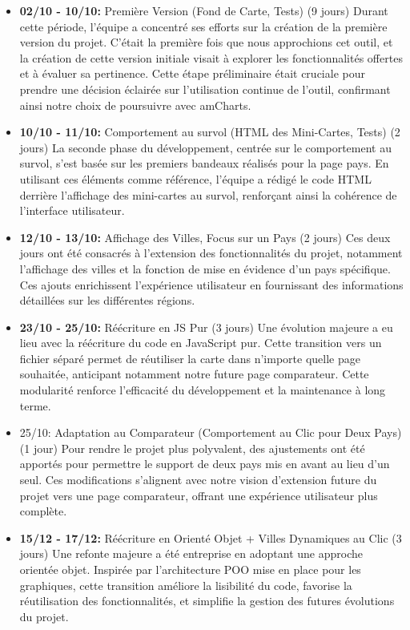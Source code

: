 \documentclass[mstat,12pt]{unswthesis}
\begin{document}
\begin{adjustwidth}{-2cm}{}
\begin{itemize}
\tightlist
\item
  \textbf{02/10 - 10/10:} Première Version (Fond de Carte, Tests) (9
  jours) Durant cette période, l'équipe a concentré ses efforts sur la
  création de la première version du projet. C'était la première fois
  que nous approchions cet outil, et la création de cette version
  initiale visait à explorer les fonctionnalités offertes et à évaluer
  sa pertinence. Cette étape préliminaire était cruciale pour prendre
  une décision éclairée sur l'utilisation continue de l'outil,
  confirmant ainsi notre choix de poursuivre avec amCharts.
\item
  \textbf{10/10 - 11/10:} Comportement au survol (HTML des Mini-Cartes,
  Tests) (2 jours) La seconde phase du développement, centrée sur le
  comportement au survol, s'est basée sur les premiers bandeaux réalisés
  pour la page pays. En utilisant ces éléments comme référence, l'équipe
  a rédigé le code HTML derrière l'affichage des mini-cartes au survol,
  renforçant ainsi la cohérence de l'interface utilisateur.
\item
  \textbf{12/10 - 13/10:} Affichage des Villes, Focus sur un Pays (2
  jours) Ces deux jours ont été consacrés à l'extension des
  fonctionnalités du projet, notamment l'affichage des villes et la
  fonction de mise en évidence d'un pays spécifique. Ces ajouts
  enrichissent l'expérience utilisateur en fournissant des informations
  détaillées sur les différentes régions.
\item
  \textbf{23/10 - 25/10:} Réécriture en JS Pur (3 jours) Une évolution
  majeure a eu lieu avec la réécriture du code en JavaScript pur. Cette
  transition vers un fichier séparé permet de réutiliser la carte dans
  n'importe quelle page souhaitée, anticipant notamment notre future
  page comparateur. Cette modularité renforce l'efficacité du
  développement et la maintenance à long terme.
\item
  25/10: Adaptation au Comparateur (Comportement au Clic pour Deux Pays)
  (1 jour) Pour rendre le projet plus polyvalent, des ajustements ont
  été apportés pour permettre le support de deux pays mis en avant au
  lieu d'un seul. Ces modifications s'alignent avec notre vision
  d'extension future du projet vers une page comparateur, offrant une
  expérience utilisateur plus complète.
\item
  \textbf{15/12 - 17/12:} Réécriture en Orienté Objet + Villes
  Dynamiques au Clic (3 jours) Une refonte majeure a été entreprise en
  adoptant une approche orientée objet. Inspirée par l'architecture POO
  mise en place pour les graphiques, cette transition améliore la
  lisibilité du code, favorise la réutilisation des fonctionnalités, et
  simplifie la gestion des futures évolutions du projet.
\end{itemize}


\end{adjustwidth}
\end{document}
